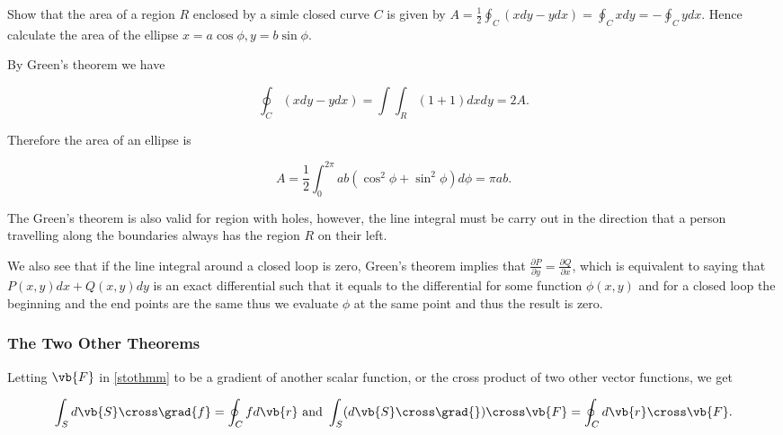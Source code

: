 \documentclass[english,a4paper,12pt]{report}
\begin{document}
{Show that the area of a region \(R\) enclosed by a simle closed curve \(C\) is given by \(A = \frac{1}{2} \oint_{C}(xdy - ydx) = \oint_{C}xdy = - \oint_{C}y dx\). Hence calculate the area of the ellipse \(x = a \cos \phi , y = b\sin \phi \). }
{By Green's theorem we have 

\begin{equation} \label{area} 
	\oint_{C} (xdy- ydx) = \int \int_{R}^{} (1+1) dxdy = 2A.  
\end{equation}

Therefore the area of an ellipse is 

\begin{equation}
	A = \frac{1}{2} \int_{0}^{2\pi } ab(\cos ^2\phi + \sin ^2\phi ) d\phi  = \pi ab.   
\end{equation}
} 

The Green's theorem is also valid for region with holes, however, the line integral must be carry out in the direction that a person travelling along the boundaries always has the region \(R\) on their left.

We also see that if the line integral around a closed loop is zero, Green's theorem implies that \(\frac{\partial P}{\partial y} = \frac{\partial Q}{\partial x} \), which is equivalent to saying that \(P(x,y) dx + Q(x,y) dy \) is an exact differential such that it equals to the differential for some function \(\phi (x,y)\) and for a closed loop the beginning and the end points are the same thus we evaluate \(\phi \) at the same point and thus the result is zero.

\subsubsection{The Two Other Theorems}

Letting \(\vb{F} \) in \cref{stothmm} to be a gradient of another scalar function, or the cross product of two other vector functions, we get 

\begin{equation}
	\int_{S}^{} d\vb{S} \cross \grad{f} = \oint_{C} fd\vb{r} \text { and } \int_{S}^{} (d\vb{S} \cross \grad{} ) \cross \vb{F} = \oint_{C} d\vb{r} \cross \vb{F} .    
\end{equation}
\end{document}
